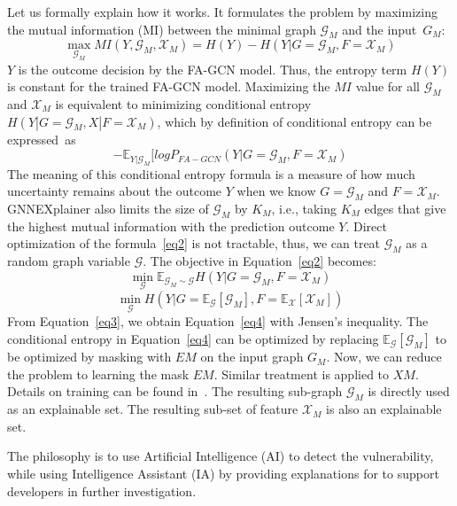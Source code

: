 Let us formally explain how it works. It
formulates the problem by maximizing the mutual information (MI)
between the minimal graph $\mathcal{G}_M$ and the input~$G_M$:
\begin{equation}\label{maineq}
\max_{\mathcal{G}_M} MI(Y,\mathcal{G}_M, \mathcal{X}_M) = H(Y) - H(Y|G=\mathcal{G}_M, F=\mathcal{X}_M)
\end{equation}
$Y$ is the outcome decision by the FA-GCN model. Thus, the entropy term
$H(Y)$ is constant for the trained FA-GCN model. Maximizing the $MI$
value for all $\mathcal{G}_M$ and $\mathcal{X}_M$ is equivalent to minimizing conditional
entropy $H(Y|G=\mathcal{G}_M, X|F=\mathcal{X}_M)$, which by definition of
conditional entropy can be expressed~as
\begin{equation}
  \label{eq2}
-\mathbb{E}_{Y|\mathcal{G}_M}
  [log P_{FA-GCN} (Y|G=\mathcal{G}_M,F=\mathcal{X}_M)
  \end{equation}
The meaning of this conditional entropy formula is a measure of how
much uncertainty remains about the outcome $Y$ when we know
$G=\mathcal{G}_M$ and $F=\mathcal{X}_M$. GNNEXplainer also limits the
size of $\mathcal{G}_M$ by $K_M$, i.e., taking $K_M$ edges that give
the highest mutual information with the prediction outcome $Y$.
%
Direct optimization of the formula~\ref{eq2} is not tractable, thus,
we can treat $\mathcal{G}_M$ as a random graph variable
$\mathcal{G}$. The objective in Equation~\ref{eq2} becomes:
\begin{equation}
  \label{eq3}
  \min_{\mathcal{G}} \mathbb{E}_{\mathcal{G}_M \sim \mathcal{G}} H(Y|G=\mathcal{G}_M,F=\mathcal{X}_M)
\end{equation}
\begin{equation}
  \label{eq4}
  \min_{\mathcal{G}} H(Y| G=\mathbb{E}_{\mathcal{G}}[\mathcal{G}_M], F = \mathbb{E}_{\mathcal{X}}[\mathcal{X}_M])
\end{equation}
From Equation~\ref{eq3}, we obtain Equation~\ref{eq4} with Jensen's
inequality.  The conditional entropy in Equation~\ref{eq4} can be
optimized by replacing $\mathbb{E}_{\mathcal{G}}[\mathcal{G}_M]$ to be
optimized by masking with $EM$ on the input graph $G_M$.
Now, we can reduce the problem to learning the mask $EM$.
Similar treatment is applied to $XM$.
Details on training can be found in~\cite{GNNExplainer}. The resulting
sub-graph $\mathcal{G}_M$ is directly used as an explainable set. The resulting sub-set of feature $\mathcal{X}_M$ is also an explainable set.

The philosophy is to use Artificial Intelligence (AI) to detect the vulnerability, while using
Intelligence Assistant (IA) by providing explanations for
to support developers in further investigation.
